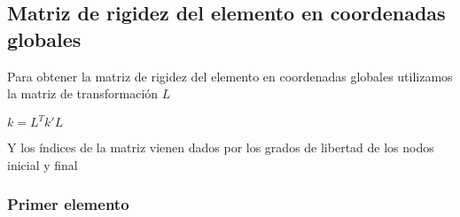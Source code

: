 \documentclass{article}
\begin{document}
    
    \subsection{Matriz de rigidez del elemento en coordenadas
globales}\label{matriz-de-rigidez-del-elemento-en-coordenadas-globales}

Para obtener la matriz de rigidez del elemento en coordenadas globales
utilizamos la matriz de transformación $L$

$k = L^T k' L$

Y los índices de la matriz vienen dados por los grados de libertad de
los nodos inicial y final

    \subsubsection{Primer elemento}\label{primer-elemento}
\end{document}
